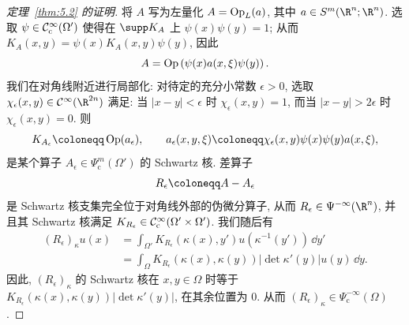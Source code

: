 \begin{proof}[定理~\ref{thm:5.2} 的证明]
将 $A$ 写为左量化 $A = \operatorname{Op}_L(a)$, 其中 $a \in S^m(\R^n; \R^n)$. 选取 $\psi \in \mathcal{C}_{\mathrm{c}}^\infty(\Omega')$ 使得在 $\supp K_A$ 上 $\psi(x) \psi(y) = 1$; 从而 $K_A(x, y) = \psi(x) K_A(x, y) \psi(y)$, 因此
\begin{equation}\label{eq:5.3}
    A = \operatorname{Op}\left( \psi(x) a(x, \xi) \psi(y) \right).
\end{equation}
我们在对角线附近进行局部化: 对待定的充分小常数 $\epsilon > 0$, 选取 $\chi_\epsilon(x, y) \in \Smooth(\R^{2n})$ 满足: 当 $|x - y| < \epsilon$ 时 $\chi_\epsilon(x, y) = 1$, 而当 $|x - y| > 2\epsilon$ 时 $\chi_\epsilon(x, y) = 0$. 则
\begin{equation}\label{eq:5.4}
    K_{A_\epsilon} \defeq \Op(a_\epsilon), \qquad a_\epsilon(x, y, \xi) \defeq \chi_\epsilon(x, y) \psi(x) \psi(y) a(x, \xi),
\end{equation}
是某个算子 $A_\epsilon \in \Psi_{\mathrm{c}}^m(\Omega')$ 的 Schwartz 核. 差算子
\begin{equation}\label{eq:5.5}
    R_\epsilon \defeq A - A_\epsilon
\end{equation}
是 Schwartz 核支集完全位于对角线外部的伪微分算子, 从而 $R_\epsilon \in \Psi^{-\infty}(\R^n)$, 并且其 Schwartz 核满足 $K_{R_\epsilon} \in \mathcal{C}_{\mathrm{c}}^\infty(\Omega' \times \Omega')$. 我们随后有
\begin{equation}\label{eq:5.6}
    \begin{aligned}
        (R_\epsilon)_\kappa u(x) &= \int_{\Omega'} K_{R_\epsilon}(\kappa(x), y') u(\kappa^{-1}(y')) \,\dd y' \\
        &= \int_\Omega K_{R_\epsilon}(\kappa(x), \kappa(y)) |\!\det \kappa'(y)| u(y) \,\dd y.
    \end{aligned}
\end{equation}
因此, $(R_\epsilon)_\kappa$ 的 Schwartz 核在 $x, y \in \Omega$ 时等于 $K_{R_\epsilon}(\kappa(x), \kappa(y)) |\!\det \kappa'(y)|$, 在其余位置为 0. 从而 $(R_\epsilon)_\kappa \in \Psi_{\mathrm{c}}^{-\infty}(\Omega)$.


\end{proof}
